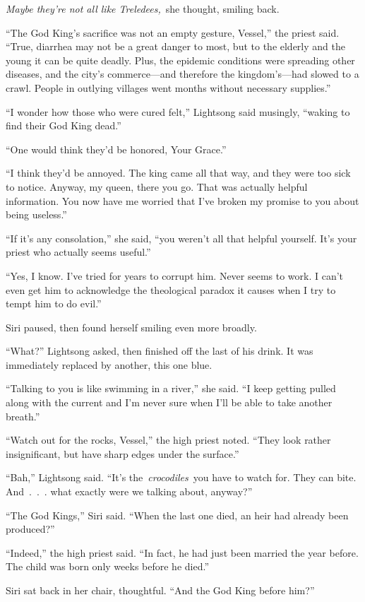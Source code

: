 \textit{Maybe they’re not all like Treledees,}~she thought, smiling back.

“The God King’s sacrifice was not an empty gesture, Vessel,” the priest said. “True, diarrhea may not be a great danger to most, but to the elderly and the young it can be quite deadly. Plus, the epidemic conditions were spreading other diseases, and the city’s commerce—and therefore the kingdom’s—had slowed to a crawl. People in outlying villages went months without necessary supplies.”

“I wonder how those who were cured felt,” Lightsong said musingly, “waking to find their God King dead.”

“One would think they’d be honored, Your Grace.”

“I think they’d be annoyed. The king came all that way, and they were too sick to notice. Anyway, my queen, there you go. That was actually helpful information. You now have me worried that I’ve broken my promise to you about being useless.”

“If it’s any consolation,” she said, “you weren’t all that helpful yourself. It’s your priest who actually seems useful.”

“Yes, I know. I’ve tried for years to corrupt him. Never seems to work. I can’t even get him to acknowledge the theological paradox it causes when I try to tempt him to do evil.”

Siri paused, then found herself smiling even more broadly.

“What?” Lightsong asked, then finished off the last of his drink. It was immediately replaced by another, this one blue.

“Talking to you is like swimming in a river,” she said. “I keep getting pulled along with the current and I’m never sure when I’ll be able to take another breath.”

“Watch out for the rocks, Vessel,” the high priest noted. “They look rather insignificant, but have sharp edges under the surface.”

“Bah,” Lightsong said. “It’s the~\textit{crocodiles}~you have to watch for. They can bite. And~.~.~. what exactly were we talking about, anyway?”

“The God Kings,” Siri said. “When the last one died, an heir had already been produced?”

“Indeed,” the high priest said. “In fact, he had just been married the year before. The child was born only weeks before he died.”

Siri sat back in her chair, thoughtful. “And the God King before him?”

